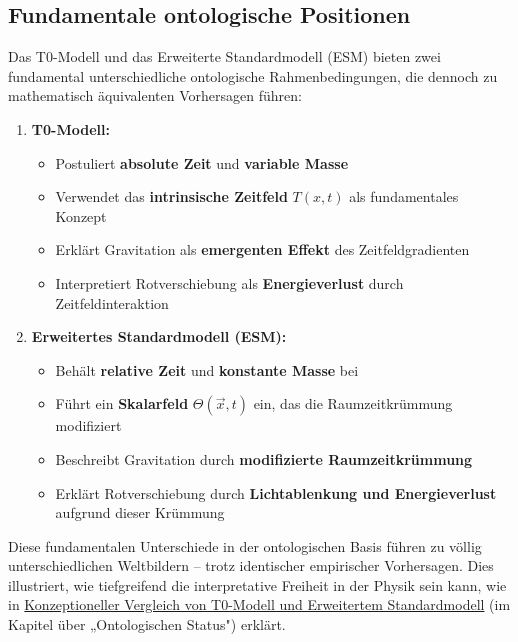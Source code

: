 \documentclass[12pt,a4paper]{article}
\newcommand{\Tfieldt}{T(x,t)}
\newcommand{\vecx}{\vec{x}}
\begin{document}
	\subsection{Fundamentale ontologische Positionen}
	\label{subsec:ontological_positions}
	
	Das T0-Modell und das Erweiterte Standardmodell (ESM) bieten zwei fundamental unterschiedliche ontologische Rahmenbedingungen, die dennoch zu mathematisch äquivalenten Vorhersagen führen:
	
	\begin{enumerate}
		\item \textbf{T0-Modell:}
		\begin{itemize}
			\item Postuliert \textbf{absolute Zeit} und \textbf{variable Masse}
			\item Verwendet das \textbf{intrinsische Zeitfeld} $\Tfieldt$ als fundamentales Konzept
			\item Erklärt Gravitation als \textbf{emergenten Effekt} des Zeitfeldgradienten
			\item Interpretiert Rotverschiebung als \textbf{Energieverlust} durch Zeitfeldinteraktion
		\end{itemize}
		
		\item \textbf{Erweitertes Standardmodell (ESM):}
		\begin{itemize}
			\item Behält \textbf{relative Zeit} und \textbf{konstante Masse} bei
			\item Führt ein \textbf{Skalarfeld} $\Theta(\vecx,t)$ ein, das die Raumzeitkrümmung modifiziert
			\item Beschreibt Gravitation durch \textbf{modifizierte Raumzeitkrümmung}
			\item Erklärt Rotverschiebung durch \textbf{Lichtablenkung und Energieverlust} aufgrund dieser Krümmung
		\end{itemize}
	\end{enumerate}
	
	Diese fundamentalen Unterschiede in der ontologischen Basis führen zu völlig unterschiedlichen Weltbildern – trotz identischer empirischer Vorhersagen. Dies illustriert, wie tiefgreifend die interpretative Freiheit in der Physik sein kann, wie in \href{https://github.com/jpascher/T0-Time-Mass-Duality/tree/main/2/pdf/English/T0vsESM_ConceptualAnalysisEn.pdf}{Konzeptioneller Vergleich von T0-Modell und Erweitertem Standardmodell} (im Kapitel über „Ontologischen Status") erklärt.
	
\end{document}

